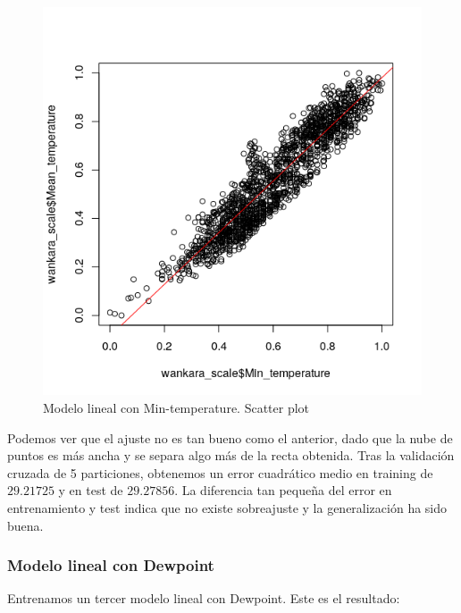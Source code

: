 \begin{figure}[H] %
	\centering
	\includegraphics[scale=0.735]{plot2.png}  %
	\caption{Modelo lineal con Min-temperature. Scatter plot} 
	\label{fig:plot2}
\end{figure}

Podemos ver que el ajuste no es tan bueno como el anterior, dado que la nube de puntos es más ancha y se separa algo más de la recta obtenida. Tras la validación cruzada de 5 particiones, obtenemos un error cuadrático medio en training de $29.21725$ y en test de $29.27856$. La diferencia tan pequeña del error en entrenamiento y test indica que no existe sobreajuste y la generalización ha sido buena. 

\subsubsection{Modelo lineal con Dewpoint}

Entrenamos un tercer modelo lineal con Dewpoint. Este es el resultado:

